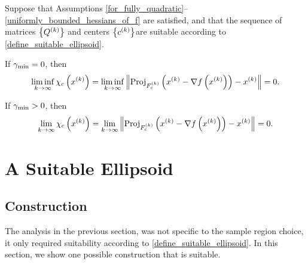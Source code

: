 \documentclass{article}
\begin{document}
\begin{theorem}\label{main_result}
Suppose that Assumptions \cref{for_fully_quadratic}--\cref{uniformly_bounded_hessians_of_f} are satisfied,
and that the sequence of matrices $\left\{{Q^{(k)}}\right\}$ and centers $\left\{c^{(k)}\right\}$are suitable according to \cref{define_suitable_ellipsoid}.


If $\gamma_{\textrm{min}} = 0$, then
\begin{align*}
\liminf_{k\to\infty} \chi_c\left(x^{(k)}\right) = \liminf_{k\to\infty} \left\|{\textrm{Proj}}_{{F_c^{(k)}}}\left(x^{(k)} - \nabla f\left(x^{(k)}\right)\right) - x^{(k)} \right\| = 0.
\end{align*}

If $\gamma_{\textrm{min}} > 0$, then
\begin{align*}
\lim_{k\to\infty} \chi_c\left(x^{(k)}\right) = \lim_{k\to\infty} \left\|{\textrm{Proj}}_{{F_c^{(k)}}}\left(x^{(k)} - \nabla f\left(x^{(k)}\right)\right) - x^{(k)} \right\| = 0.
\end{align*}
\end{theorem}




\section{A Suitable Ellipsoid}
\label{sec:ellipsoidal}
%
%



\subsection{Construction}
\label{the_safe_ellipsoid}

The analysis in the previous section, was not specific to the sample region choice, it only required suitability according to \cref{define_suitable_ellipsoid}.
In this section, we show one possible construction that is suitable.
\end{document}
